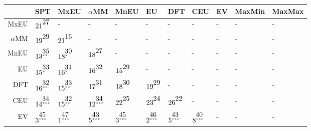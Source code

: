 \documentclass[a4paper]{article}\usepackage[]{graphicx}\usepackage[]{color}
\renewcommand{\tabcolsep}{3pt}
\renewenvironment{table*}[1][1]{
  \begin{table}[#1]\footnotesize
    \begin{adjustwidth}{-1cm}{}
    }{
    \end{adjustwidth}
  \end{table}}
\begin{document}
\begin{table*}[!htb]
\centering
\begin{tabular}{rllllllllll}
  \hline
 & SPT & MxEU & $\alpha$MM & MnEU & EU & DFT & CEU & EV & MaxMin & MaxMax \\ 
  \hline
MxEU & $21^{\stackrel{\textstyle27\hfill}{\scriptscriptstyle\hfill}}$ & - & - & - & - & - & - & - & - & - \\ 
  $\alpha$MM & $19^{\stackrel{\textstyle29\hfill}{\scriptscriptstyle\hfill}}$ & $21^{\stackrel{\textstyle16\hfill}{\scriptscriptstyle\hfill}}$ & - & - & - & - & - & - & - & - \\ 
  MnEU & $13^{\stackrel{\textstyle35\hfill}{\scriptscriptstyle**\hfill}}$ & $18^{\stackrel{\textstyle30\hfill}{\scriptscriptstyle*\hfill}}$ & $18^{\stackrel{\textstyle27\hfill}{\scriptscriptstyle\hfill}}$ & - & - & - & - & - & - & - \\ 
  EU & $15^{\stackrel{\textstyle33\hfill}{\scriptscriptstyle*\hfill}}$ & $16^{\stackrel{\textstyle31\hfill}{\scriptscriptstyle*\hfill}}$ & $16^{\stackrel{\textstyle32\hfill}{\scriptscriptstyle\hfill}}$ & $15^{\stackrel{\textstyle29\hfill}{\scriptscriptstyle\hfill}}$ & - & - & - & - & - & - \\ 
  DFT & $16^{\stackrel{\textstyle32\hfill}{\scriptscriptstyle**\hfill}}$ & $15^{\stackrel{\textstyle33\hfill}{\scriptscriptstyle**\hfill}}$ & $17^{\stackrel{\textstyle31\hfill}{\scriptscriptstyle\hfill}}$ & $18^{\stackrel{\textstyle30\hfill}{\scriptscriptstyle\hfill}}$ & $19^{\stackrel{\textstyle29\hfill}{\scriptscriptstyle\hfill}}$ & - & - & - & - & - \\ 
  CEU & $14^{\stackrel{\textstyle34\hfill}{\scriptscriptstyle***\hfill}}$ & $15^{\stackrel{\textstyle32\hfill}{\scriptscriptstyle**\hfill}}$ & $12^{\stackrel{\textstyle34\hfill}{\scriptscriptstyle***\hfill}}$ & $22^{\stackrel{\textstyle25\hfill}{\scriptscriptstyle\hfill}}$ & $23^{\stackrel{\textstyle24\hfill}{\scriptscriptstyle\hfill}}$ & $26^{\stackrel{\textstyle22\hfill}{\scriptscriptstyle\hfill}}$ & - & - & - & - \\ 
  EV & $3^{\stackrel{\textstyle45\hfill}{\scriptscriptstyle***\hfill}}$ & $1^{\stackrel{\textstyle47\hfill}{\scriptscriptstyle***\hfill}}$ & $5^{\stackrel{\textstyle43\hfill}{\scriptscriptstyle***\hfill}}$ & $3^{\stackrel{\textstyle45\hfill}{\scriptscriptstyle***\hfill}}$ & $2^{\stackrel{\textstyle46\hfill}{\scriptscriptstyle***\hfill}}$ & $5^{\stackrel{\textstyle43\hfill}{\scriptscriptstyle***\hfill}}$ & $8^{\stackrel{\textstyle40\hfill}{\scriptscriptstyle***\hfill}}$ & - & - & - \\ 

\end{tabular}
\end{table*}
\end{document}
